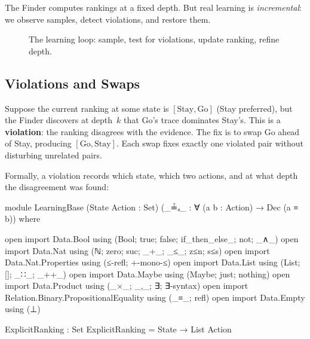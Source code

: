\documentclass[9pt,a4paper]{article}
\theoremstyle{plain}
\theoremstyle{definition}
\theoremstyle{remark}
\begin{document}
The Finder computes rankings at a fixed depth. But real learning is \emph{incremental}: we observe samples, detect violations, and restore them.

\begin{figure}[H]
\centering
{}
\caption{The learning loop: sample, test for violations, update ranking, refine depth.}
\label{fig:learning-loop}
\end{figure}

\subsection{Violations and Swaps}

Suppose the current ranking at some state is $[\text{Stay}, \text{Go}]$ (Stay preferred), but the Finder discovers at depth~$k$ that Go's trace dominates Stay's.  This is a \textbf{violation}: the ranking disagrees with the evidence.  The fix is to swap Go ahead of Stay, producing $[\text{Go}, \text{Stay}]$.  Each swap fixes exactly one violated pair without disturbing unrelated pairs.

Formally, a violation records which state, which two actions, and at what depth the disagreement was found:

\begin{code}[hide]
module LearningBase
  (State Action : Set)
  (_≟ₐ_ : ∀ (a b : Action) → Dec (a ≡ b))
  where

  open import Data.Bool using (Bool; true; false; if_then_else_; not; _∧_)
  open import Data.Nat using (ℕ; zero; suc; _+_; _≤_; z≤n; s≤s)
  open import Data.Nat.Properties using (≤-refl; +-mono-≤)
  open import Data.List using (List; []; _∷_; _++_)
  open import Data.Maybe using (Maybe; just; nothing)
  open import Data.Product using (_×_; _,_; ∃; ∃-syntax)
  open import Relation.Binary.PropositionalEquality using (_≡_; refl)
  open import Data.Empty using (⊥)

  ExplicitRanking : Set
  ExplicitRanking = State → List Action
\end{code}
\end{document}
